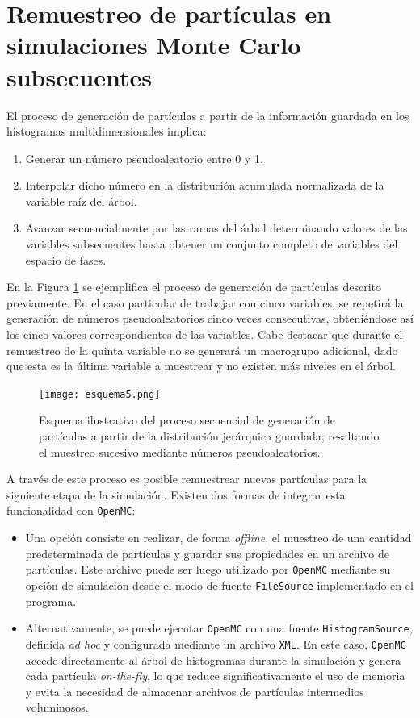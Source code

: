 \section{Remuestreo de partículas en simulaciones Monte Carlo subsecuentes}
El proceso de generación de partículas a partir de la información guardada en los histogramas multidimensionales implica:
\begin{enumerate}
    \item Generar un número pseudoaleatorio entre 0 y 1.
    \item Interpolar dicho número en la distribución acumulada normalizada de la variable raíz del árbol.
    \item Avanzar secuencialmente por las ramas del árbol determinando valores de las variables subsecuentes hasta obtener un conjunto completo de variables del espacio de fases.
\end{enumerate}

En la Figura \ref{fig:esquema_generacion_particulas} se ejemplifica el proceso de generación de partículas descrito previamente. En el caso particular de trabajar con cinco variables, se repetirá la generación de números pseudoaleatorios cinco veces consecutivas, obteniéndose así los cinco valores correspondientes de las variables. Cabe destacar que durante el remuestreo de la quinta variable no se generará un macrogrupo adicional, dado que esta es la última variable a muestrear y no existen más niveles en el árbol.

\begin{figure}[H]
    \centering
    \texttt{[image: esquema5.png]}
    \caption{Esquema ilustrativo del proceso secuencial de generación de partículas a partir de la distribución jerárquica guardada, resaltando el muestreo sucesivo mediante números pseudoaleatorios.}
    \label{fig:esquema_generacion_particulas}
\end{figure}

A través de este proceso es posible remuestrear nuevas partículas para la siguiente etapa de la simulación. Existen dos formas de integrar esta funcionalidad con \texttt{OpenMC}:

\begin{itemize}
    \item Una opción consiste en realizar, de forma \emph{offline}, el muestreo de una cantidad predeterminada de partículas y guardar sus propiedades en un archivo de partículas. Este archivo puede ser luego utilizado por \texttt{OpenMC} mediante su opción de simulación desde el modo de fuente \texttt{FileSource} implementado en el programa.
    
    \item Alternativamente, se puede ejecutar \texttt{OpenMC} con una fuente \texttt{HistogramSource}, definida \textit{ad hoc} y configurada mediante un archivo \texttt{XML}. En este caso, \texttt{OpenMC} accede directamente al árbol de histogramas durante la simulación y genera cada partícula \emph{on-the-fly}, lo que reduce significativamente el uso de memoria y evita la necesidad de almacenar archivos de partículas intermedios voluminosos.
\end{itemize}

